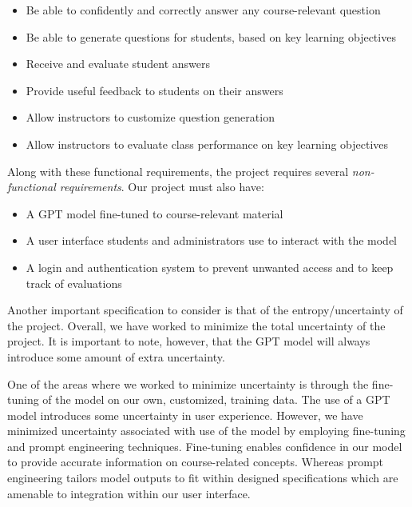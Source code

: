 \documentclass[12pt,a4paper]{article}
\begin{document}
    \begin{itemize}
        \label{functionalReqs}

        \item Be able to confidently and correctly answer any course-relevant question
        \item Be able to generate questions for students, based on key learning objectives
        \item Receive and evaluate student answers
        \item Provide useful feedback to students on their answers
        \item Allow instructors to customize question generation
        \item Allow instructors to evaluate class performance on key learning objectives
    \end{itemize}

    Along with these functional requirements, the project requires several \textit{non-functional
    requirements}.  Our project must also have:

    \begin{itemize}
        \label{nonFunctionalReqs}
        \item A GPT model fine-tuned to course-relevant material
        \item A user interface students and administrators use to interact with the model
        \item A login and authentication system to prevent unwanted access and to keep track of evaluations
    \end{itemize}

    Another important specification to consider is that of the entropy/uncertainty of the project.
    Overall, we have worked to minimize the total uncertainty of the project.  It is important to note,
    however, that the GPT model will always introduce some amount of extra uncertainty.

    One of the areas where we worked to minimize uncertainty is through the fine-tuning of the model on our
    own, customized, training data. The use of a GPT model introduces some uncertainty in user experience. However, we have minimized uncertainty associated with use of the model by employing fine-tuning and prompt engineering techniques. Fine-tuning enables confidence in our model to provide accurate information on course-related concepts. Whereas prompt engineering tailors model outputs to fit within designed specifications which are amenable to integration within our user interface. 
\end{document}

